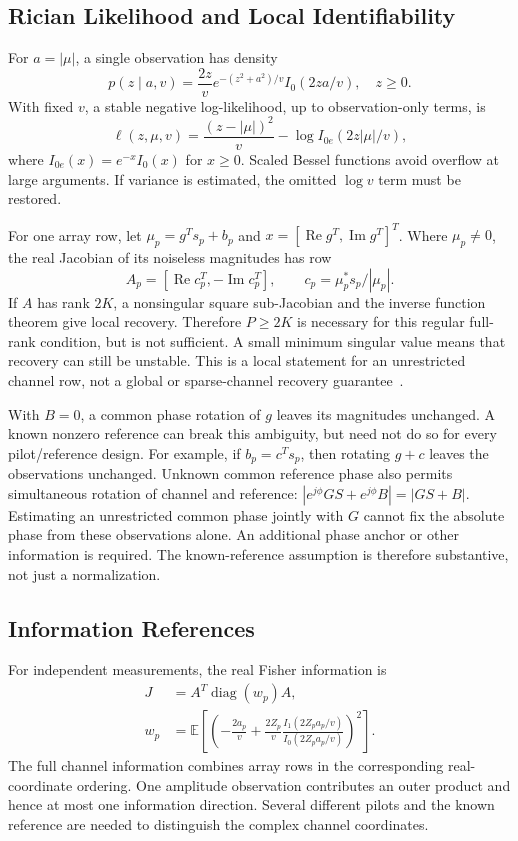 \documentclass[10pt,journal,letterpaper]{IEEEtran}
\DeclareMathOperator{\diag}{diag}
\begin{document}
\subsection{Rician Likelihood and Local Identifiability}
For $a=|\mu|$, a single observation has density
\begin{equation}
 p(z\mid a,v)=\frac{2z}{v}e^{-(z^2+a^2)/v}I_0(2za/v),\quad z\ge0.
\end{equation}
With fixed $v$, a stable negative log-likelihood, up to observation-only terms, is
\begin{equation}
 \ell(z,\mu,v)=\frac{(z-|\mu|)^2}{v}-\log I_{0e}(2z|\mu|/v),
 \label{eq:loss}
\end{equation}
where $I_{0e}(x)=e^{-x}I_0(x)$ for $x\ge0$. Scaled Bessel functions avoid overflow at large arguments. If variance is estimated, the omitted $\log v$ term must be restored.

For one array row, let $\mu_p=g^Ts_p+b_p$ and $x=[\operatorname{Re}g^T,\operatorname{Im}g^T]^T$. Where $\mu_p\ne0$, the real Jacobian of its noiseless magnitudes has row
\begin{equation}
 A_p=[\operatorname{Re}c_p^T,-\operatorname{Im}c_p^T],\qquad
 c_p=\mu_p^*s_p/|\mu_p|.
 \label{eq:jacobian}
\end{equation}
If $A$ has rank $2K$, a nonsingular square sub-Jacobian and the inverse function theorem give local recovery. Therefore $P\ge2K$ is necessary for this regular full-rank condition, but is not sufficient. A small minimum singular value means that recovery can still be unstable. This is a local statement for an unrestricted channel row, not a global or sparse-channel recovery guarantee~\cite{gao2018}.

With $B=0$, a common phase rotation of $g$ leaves its magnitudes unchanged. A known nonzero reference can break this ambiguity, but need not do so for every pilot/reference design. For example, if $b_p=c^Ts_p$, then rotating $g+c$ leaves the observations unchanged. Unknown common reference phase also permits simultaneous rotation of channel and reference: $|e^{j\phi}GS+e^{j\phi}B|=|GS+B|$. Estimating an unrestricted common phase jointly with $G$ cannot fix the absolute phase from these observations alone. An additional phase anchor or other information is required. The known-reference assumption is therefore substantive, not just a normalization.

\subsection{Information References}
For independent measurements, the real Fisher information is
\begin{align}
 J&=A^T\diag(w_p)A,\nonumber\\
 w_p&=\mathbb E\!\left[\left(-\frac{2a_p}{v}+\frac{2Z_p}{v}
 \frac{I_1(2Z_pa_p/v)}{I_0(2Z_pa_p/v)}\right)^2\right].
 \label{eq:fisher}
\end{align}
The full channel information combines array rows in the corresponding real-coordinate ordering. One amplitude observation contributes an outer product and hence at most one information direction. Several different pilots and the known reference are needed to distinguish the complex channel coordinates.
\end{document}
